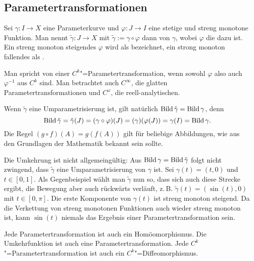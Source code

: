\subsection{Parametertransformationen}

\begin{definition}
Sei $\gamma\colon I\to X$ eine Parameterkurve und $\varphi\colon J\to I$
eine stetige und streng monotone Funktion. Man nennt
$\tilde\gamma\colon J\to X$ mit $\tilde\gamma:=\gamma\circ\varphi$ dann
 von $\gamma$, wobei $\varphi$ die
 dazu ist. Ein streng monoton steigendes
$\varphi$ wird als  bezeichnet,
ein strong monoton fallendes als .

Man spricht von einer $C^k$"=Parametertransformation, wenn sowohl
$\varphi$ also auch $\varphi^{-1}$ aus $C^k$ sind. Man betrachtet
auch $C^\infty$, die glatten Parametertransformationen und
$C^\omega$, die reell-analytischen.
\end{definition}

\noindent
Wenn $\tilde\gamma$ eine Umparametrisierung ist, gilt natürlich
$\operatorname{Bild}\tilde\gamma=\operatorname{Bild}\gamma$, denn
\begin{equation}
\operatorname{Bild}\tilde\gamma = \tilde\gamma(J)
= (\gamma\circ\varphi)(J) = (\gamma)(\varphi(J))
= \gamma(I) = \operatorname{Bild}\gamma.
\end{equation}
Die Regel $(g\circ f)(A)=g(f(A))$ gilt für beliebige Abbildungen,
wie aus den Grundlagen der Mathematik bekannt sein sollte.

Die Umkehrung ist nicht allgemeingültig: Aus
$\operatorname{Bild}\gamma=\operatorname{Bild}\tilde\gamma$ folgt nicht zwingend, dass
$\tilde\gamma$ eine Umparametrisierung von $\gamma$ ist. Sei
$\gamma(t)=(t,0)$ und $t\in[0,1]$. Als Gegenbeispiel wählt man
$\tilde\gamma$ nun so, dass sich auch diese Strecke ergibt, die
Bewegung aber auch rückwärts verläuft, z.\,B. $\tilde\gamma(t)=(\sin(t),0)$
mit $t\in[0,\pi]$. Die erste Komponente von $\gamma(t)$ ist streng
monoton steigend. Da die Verkettung von streng monotonen Funktionen
auch wieder streng monoton ist, kann $\sin(t)$ niemals das Ergebnis
einer Parametertransformation sein.

\begin{corollary}
Jede Parametertransformation ist auch ein
Homöomorphismus. Die Umkehrfunktion ist auch eine
Parametertransformation. Jede $C^k$"=Parametertransformation
ist auch ein $C^k$"=Diffeomorphismus.
\end{corollary}

